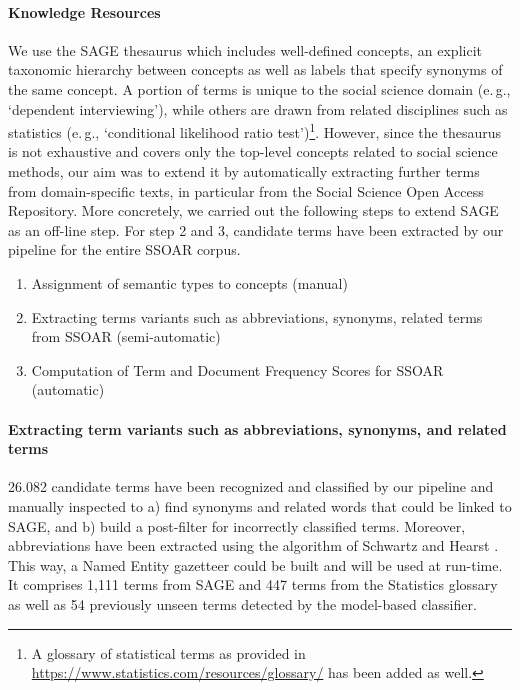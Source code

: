 \paragraph{Knowledge Resources}%
We use the SAGE thesaurus which includes well-defined concepts, an explicit taxonomic hierarchy between concepts as well as labels that specify synonyms of the same concept.
A portion of terms is unique to the social science domain (e.\,g.,  `dependent interviewing'), while others are drawn from related disciplines such as statistics (e.\,g., `conditional likelihood ratio test')\footnote{A glossary of statistical terms as provided in \url{https://www.statistics.com/resources/glossary/} has been added as well.}.
However, since the thesaurus is not exhaustive and covers only the top-level concepts related to social science methods, our aim was to extend it by automatically extracting further terms from domain-specific texts, in particular from the Social Science Open Access Repository.
More concretely, we carried out the following steps to extend SAGE as an off-line step. For step 2 and 3, candidate terms have been extracted by our pipeline for the entire SSOAR corpus. 
\begin{enumerate}
\item Assignment of semantic types to concepts (manual) 
\item Extracting terms variants such as abbreviations, synonyms, related terms from SSOAR (semi-automatic)
\item Computation of Term and Document Frequency Scores for SSOAR (automatic)
\end{enumerate}

\paragraph{Extracting term variants such as abbreviations, synonyms, and related terms}%
26.082 candidate terms have been recognized and classified by our pipeline and manually inspected to  
a) find synonyms and related words that could be linked to SAGE, and
b) build a post-filter for incorrectly classified terms.  
Moreover, abbreviations have been extracted using the algorithm of Schwartz and Hearst
\cite{SchwartzH03}.
This way, a Named Entity gazetteer could be built and will be used at run-time. It comprises 1,111 terms from SAGE and 447 terms from the Statistics glossary as well as 54 previously unseen terms detected by the model-based classifier. 




